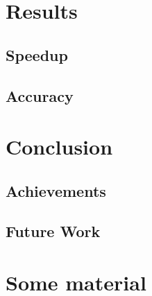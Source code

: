 \documentclass[mscthesis]{usiinfthesis}
\begin{document}
\chapter{Results}
\label{ch:res}
\section{Speedup}
\label{ch:res_speed}
\section{Accuracy}
\label{ch:res_prec}

\chapter{Conclusion}
\label{ch:conc}

\section{Achievements}
\label{ch:conc_ach}

\section{Future Work}
\label{ch:conc_work}

\nocite{*}

\appendix %

\chapter{Some material}

\backmatter


%
%
%
%
%

%


\end{document}
